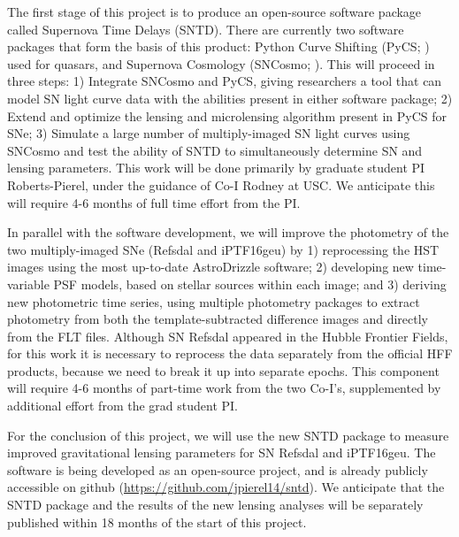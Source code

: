 The first stage of this project is to produce an open-source software
package called Supernova Time Delays (SNTD).  There are currently two
software packages that form the basis of this product: Python Curve
Shifting (PyCS; \citealt{Tewes:2013a}) used for quasars, and Supernova
Cosmology (SNCosmo; \citep{Barbary:2014}). This will proceed in three
steps: 1) Integrate SNCosmo and PyCS, giving researchers a tool that
can model SN light curve data with the abilities present in either
software package; 2) Extend and optimize the lensing and microlensing
algorithm present in PyCS for SNe; 3) Simulate a large number of
multiply-imaged SN light curves using SNCosmo and test the ability of
SNTD to simultaneously determine SN and lensing parameters. This work
will be done primarily by graduate student PI Roberts-Pierel, under
the guidance of Co-I Rodney at USC.  We anticipate this will require
4-6 months of full time effort from the PI.  

In parallel with the software development, we will improve the
photometry of the two multiply-imaged SNe (Refsdal and iPTF16geu) by
1) reprocessing the HST images using the most up-to-date AstroDrizzle
software; 2) developing new time-variable PSF models, based on stellar
sources within each image; and 3) deriving new photometric time
series, using multiple photometry packages to extract photometry from
both the template-subtracted difference images and directly from the
FLT files. Although SN Refsdal appeared in the Hubble Frontier Fields,
for this work it is necessary to reprocess the data separately from
the official HFF products, because we need to break it up into
separate epochs.  This component will require 4-6 months of part-time
work from the two Co-I's, supplemented by additional effort from the
grad student PI.

For the conclusion of this project, we will use the new SNTD package
to measure improved gravitational lensing parameters for SN Refsdal
and iPTF16geu.  The software is being developed as an open-source
project, and is already publicly accessible on github
(\url{https://github.com/jpierel14/sntd}).  We anticipate that the
SNTD package and the results of the new lensing analyses will be
separately published within 18 months of the start of this project.